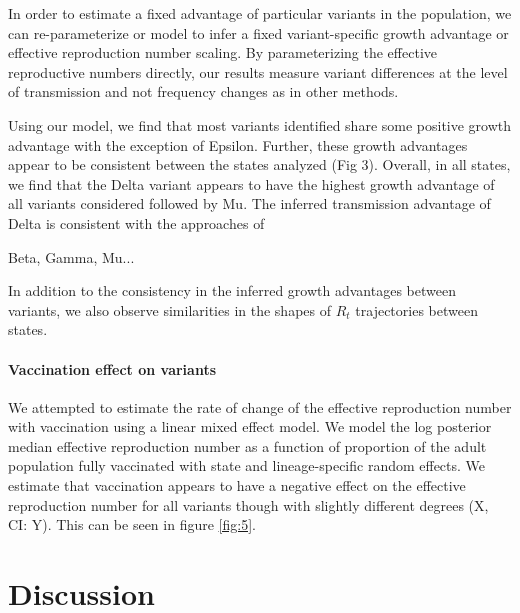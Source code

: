 \documentclass[12pt]{article}
\begin{document}
In order to estimate a fixed advantage of particular variants in the population, we can re-parameterize or model to infer a fixed variant-specific growth advantage or effective reproduction number scaling. 
By parameterizing the effective reproductive numbers directly, our results measure variant differences at the level of transmission and not frequency changes as in other methods.

Using our model, we find that most variants identified share some positive growth advantage with the exception of Epsilon. 
Further, these growth advantages appear to be consistent between the states analyzed (Fig 3).
Overall, in all states, we find that the Delta variant appears to have the highest growth advantage of all variants considered followed by Mu. 
The inferred transmission advantage of Delta is consistent with the approaches of %

Beta, Gamma, Mu...

In addition to the consistency in the inferred growth advantages between variants, we also observe similarities in the shapes of $R_{t}$ trajectories between states. %

\paragraph{Vaccination effect on variants}

We attempted to estimate the rate of change of the effective reproduction number with vaccination using a linear mixed effect model. We model the log posterior median effective reproduction number as a function of proportion of the adult population fully vaccinated with state and lineage-specific random effects. We estimate that vaccination appears to have a negative effect on the effective reproduction number for all variants though with slightly different degrees (X, CI: Y). This can be seen in figure \ref{fig:5}.


\section{Discussion}%
\end{document}
